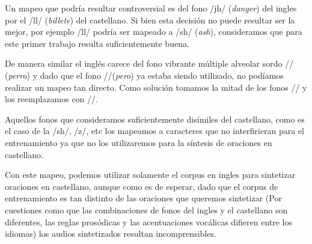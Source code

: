 Un mapeo que podría resultar controversial es del fono /jh/ (\textit{danger}) del ingles por el /ll/ (\textit{billete}) del castellano. Si bien esta decisión no puede resultar ser la mejor, por ejemplo /ll/ podría ser mapeado a /sh/ (\textit{ash}), consideramos que para este primer trabajo resulta suficientemente buena.

De manera similar el inglés carece del fono vibrante múltiple alveolar sordo // (\textit{perro}) y dado que el fono //(\textit{pero})  ya estaba siendo utilizado, no podíamos realizar un mapeo tan directo. Como solución tomamos la mitad de los fonos // y los reemplazamos con //. 


Aquellos fonos que consideramos suficientemente disímiles del castellano, como es el caso de la /sh/, /z/, etc los mapeamos a caracteres que no interfirieran para el entrenamiento ya que no los utilizaremos para la síntesis de oraciones en castellano.


Con este mapeo, podemos utilizar solamente el corpus en ingles para sintetizar oraciones en castellano, aunque como es de esperar, dado que el corpus de entrenamiento es tan distinto de las oraciones que queremos sintetizar (Por cuestiones como que las combinaciones de fonos del ingles y el castellano son diferentes, las reglas prosódicas y las acentuaciones vocálicas difieren entre los idiomas) los audios sintetizados resultan incomprensibles.

